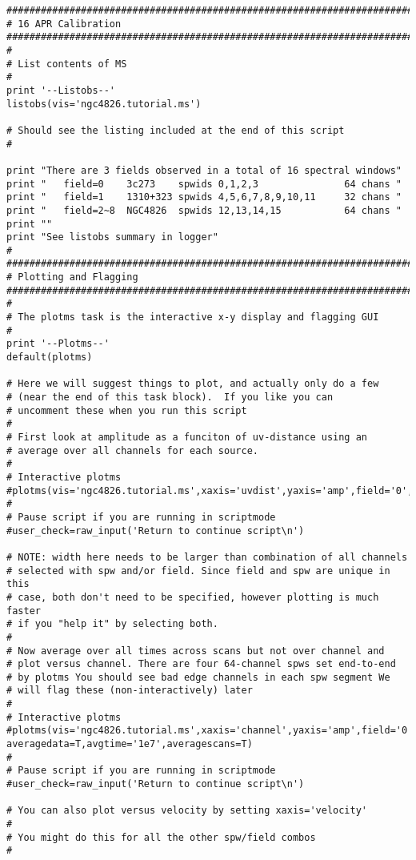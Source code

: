 \begin{verbatim}
##########################################################################
# 16 APR Calibration
##########################################################################
#
# List contents of MS
#
print '--Listobs--'
listobs(vis='ngc4826.tutorial.ms')

# Should see the listing included at the end of this script
#

print "There are 3 fields observed in a total of 16 spectral windows"
print "   field=0    3c273    spwids 0,1,2,3               64 chans "
print "   field=1    1310+323 spwids 4,5,6,7,8,9,10,11     32 chans "
print "   field=2~8  NGC4826  spwids 12,13,14,15           64 chans "
print ""
print "See listobs summary in logger"
#
##########################################################################
# Plotting and Flagging
##########################################################################
#
# The plotms task is the interactive x-y display and flagging GUI
#
print '--Plotms--'
default(plotms)

# Here we will suggest things to plot, and actually only do a few
# (near the end of this task block).  If you like you can
# uncomment these when you run this script
#
# First look at amplitude as a funciton of uv-distance using an
# average over all channels for each source.
#
# Interactive plotms
#plotms(vis='ngc4826.tutorial.ms',xaxis='uvdist',yaxis='amp',field='0',spw='0~3',width='1000')
#	
# Pause script if you are running in scriptmode
#user_check=raw_input('Return to continue script\n')

# NOTE: width here needs to be larger than combination of all channels
# selected with spw and/or field. Since field and spw are unique in this
# case, both don't need to be specified, however plotting is much faster
# if you "help it" by selecting both.
#
# Now average over all times across scans but not over channel and
# plot versus channel. There are four 64-channel spws set end-to-end
# by plotms You should see bad edge channels in each spw segment We
# will flag these (non-interactively) later
#
# Interactive plotms
#plotms(vis='ngc4826.tutorial.ms',xaxis='channel',yaxis='amp',field='0',spw='0~3', averagedata=T,avgtime='1e7',averagescans=T)
#
# Pause script if you are running in scriptmode
#user_check=raw_input('Return to continue script\n')

# You can also plot versus velocity by setting xaxis='velocity'
#
# You might do this for all the other spw/field combos
#


\end{verbatim}

